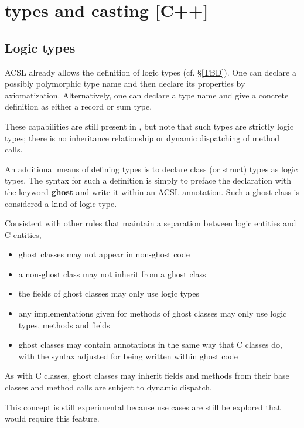 \section{\lang{} types and casting [C++]}
\label{sec:types}

\subsection{Logic types}

ACSL already allows the definition of logic types (cf. \S\ref{TBD}). One can  declare a possibly polymorphic type name and then declare its properties by axiomatization. Alternatively, one can declare 
a type name and give a concrete definition as either a record or sum type.

These capabilities are still present in \NAME{}, but note that such types are strictly logic types; there is no inheritance relationship or dynamic dispatching of method calls.

\experimental

An additional means of defining types is to declare
\lang{} class (or struct) types as logic types. The syntax for such a definition is simply to preface the declaration
with the keyword \textbf{ghost} and write it within an ACSL annotation. Such a ghost class is considered a kind of logic type.

Consistent with other rules that maintain a separation between logic entities and C entities,
\begin{itemize}
	\item ghost classes may not appear in non-ghost code
	\item a non-ghost class may not inherit from a ghost class
	\item the fields of ghost classes may only use logic types
	\item any implementations given for methods of ghost classes may only use logic types, methods and fields
	\item ghost classes may contain \NAME{} annotations in the same way that C classes do, with the syntax adjusted for being written within ghost code
\end{itemize}

As with C classes, ghost classes may inherit fields and methods from their base classes and method calls are subject to dynamic dispatch.

This concept is still experimental because use cases are still be explored that would require this feature.

